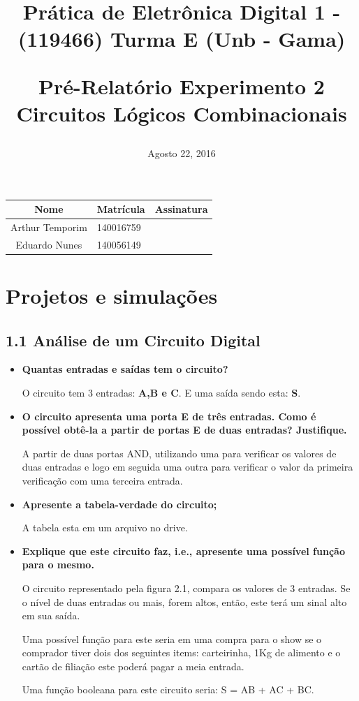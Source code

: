 \documentclass[12pts]{article}
\title{
	Prática de Eletrônica Digital 1 - (119466)
	\singlespacing
		Turma E (Unb - Gama)
	\singlespacing
	\begin{midpage}
	\begin {large}
		Pré-Relatório Experimento 2
		\singlespace
		Circuitos Lógicos Combinacionais
	\end {large}
	\end{midpage}
}
\date{Agosto 22, 2016}
\begin{document}
\maketitle	
\begin{center}

\begin{tabular}{|c|l|r|}
\hline
Nome & Matrícula & Assinatura\\
\hline
Arthur Temporim & 140016759 & \\
\hline	
Eduardo Nunes& 140056149 & \\
\hline	
\end{tabular}

\end{center}

\pagebreak

\section{Projetos e simulações}

\subsection{1.1 Análise de um Circuito Digital}

\begin{itemize}
	\item \textbf{Quantas entradas e saídas tem o circuito?}
	
	O circuito tem 3 entradas: \textbf{A,B e C}. E uma saída sendo esta: \textbf{S}.

	\item \textbf{O circuito apresenta uma porta E de três entradas. Como é possível obtê-la a partir de portas E de duas entradas? Justifique.}
	
	A partir de duas portas AND, utilizando uma para verificar os valores de duas entradas e logo em seguida uma outra para verificar o valor da primeira verificação com uma terceira entrada.
	
	\item \textbf{Apresente a tabela-verdade do circuito;}
	
	A tabela esta em um arquivo no drive.
	
	\item \textbf{Explique que este circuito faz, i.e., apresente uma possível função para o mesmo.}
	
	O circuito representado pela figura 2.1, compara os valores de 3 entradas. Se o nível de duas entradas ou mais, forem altos, então, este terá um sinal alto em sua saída.
	
	Uma possível função para este seria em uma compra para o show se o comprador tiver dois dos seguintes items: carteirinha, 1Kg de alimento e o cartão de filiação este poderá pagar a meia entrada.
	
	Uma função booleana para este circuito seria: S = AB + AC +  BC.
	
\end{itemize}
\end{document}
